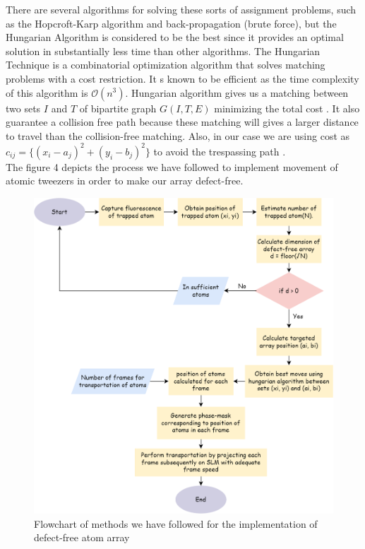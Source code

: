 There are several algorithms for solving these sorts of assignment problems, such as the Hopcroft-Karp algorithm and back-propagation (brute force), but the Hungarian Algorithm is considered to be the best since it provides an optimal solution in substantially less time than other algorithms. The Hungarian Technique is a combinatorial optimization algorithm that solves matching problems with a cost restriction. It s known to be efficient as the time complexity of this algorithm is $\mathscr{O}(n^3)$. Hungarian algorithm gives us a matching between two sets $I$ and $T$ of bipartite graph $G(I, T, E)$ minimizing the total cost \cite{golin-notes}. It also guarantee a collision free path because these matching will gives a larger distance to travel than the collision-free matching. Also, in our case we are using cost as $c_{ij} = \{(x_i - a_j)^2 + (y_i - b_j)^2\}$ to avoid the trespassing path \cite{lee2017defect}.\\

The figure 4 depicts the process we have followed to implement movement of atomic tweezers in order to make our array defect-free.

\vspace{1cm}

\begin{figure}[H]
\label{fig:flow chart}
\centering
\includegraphics[width=0.9
\textwidth]{img/flowchart.png}
\caption{Flowchart of methods we have followed for the implementation of defect-free atom array}
\end{figure}
